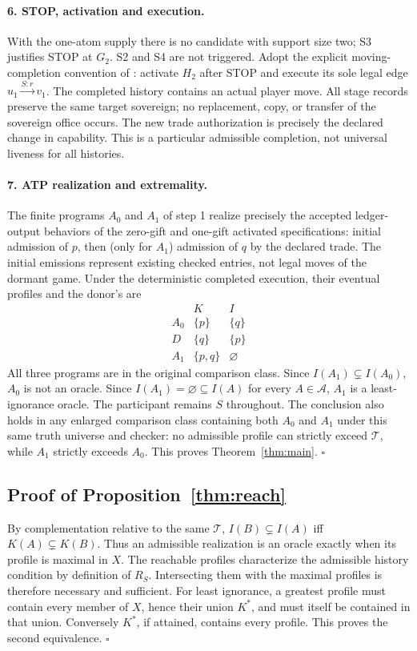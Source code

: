 \documentclass[11pt]{article}
\theoremstyle{definition}\newtheorem{definition}[theorem]{Definition}
\newcommand{\T}{\mathcal T}\newcommand{\A}{\mathcal A}\newcommand{\id}{\operatorname{ID}}\newcommand{\Con}{\operatorname{Con}}\newcommand{\Oracle}{\operatorname{Oracle}}\newcommand{\Btrade}{\mathrm{B11}}
\begin{document}
\paragraph{6. STOP, activation and execution.} With the one-atom supply there is no candidate with support size two; S3 justifies STOP at $G_2$. S2 and S4 are not triggered. Adopt the explicit moving-completion convention of \cite[Prop.~6.4, Def.~13.1]{gift}: activate $H_2$ after STOP and execute its sole legal edge $u_1\xrightarrow{S:r}v_1$. The completed history contains an actual player move. All stage records preserve the same target sovereign; no replacement, copy, or transfer of the sovereign office occurs. The new trade authorization is precisely the declared change in capability. This is a particular admissible completion, not universal liveness for all histories.
\paragraph{7. ATP realization and extremality.} The finite programs $A_0$ and $A_1$ of step 1 realize precisely the accepted ledger-output behaviors of the zero-gift and one-gift activated specifications: initial admission of $p$, then (only for $A_1$) admission of $q$ by the declared trade. The initial emissions represent existing checked entries, not legal moves of the dormant game. Under the deterministic completed execution, their eventual profiles and the donor's are
\[
\begin{array}{c|cc}
 &K&I\\\hline
 A_0&\{p\}&\{q\}\\
 D&\{q\}&\{p\}\\
 A_1&\{p,q\}&\varnothing
\end{array}
\]
All three programs are in the original comparison class. Since $I(A_1)\subsetneq I(A_0)$, $A_0$ is not an oracle. Since $I(A_1)=\varnothing\subseteq I(A)$ for every $A\in\A$, $A_1$ is a least-ignorance oracle. The participant remains $S$ throughout. The conclusion also holds in any enlarged comparison class containing both $A_0$ and $A_1$ under this same truth universe and checker: no admissible profile can strictly exceed $\T$, while $A_1$ strictly exceeds $A_0$. This proves Theorem~\ref{thm:main}. \hfill$\square$
\subsection{Proof of Proposition~\ref{thm:reach}}
By complementation relative to the same $\T$, $I(B)\subsetneq I(A)$ iff $K(A)\subsetneq K(B)$. Thus an admissible realization is an oracle exactly when its profile is maximal in $X$. The reachable profiles characterize the admissible history condition by definition of $R_S$. Intersecting them with the maximal profiles is therefore necessary and sufficient. For least ignorance, a greatest profile must contain every member of $X$, hence their union $K^*$, and must itself be contained in that union. Conversely $K^*$, if attained, contains every profile. This proves the second equivalence. \hfill$\square$
\end{document}
